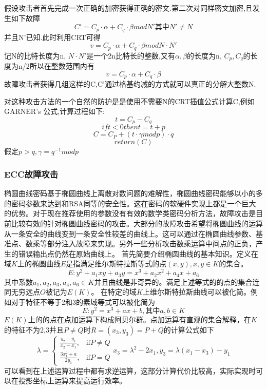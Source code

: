 \documentclass[a4paper,12pt]{article}
\begin{document}
\begin{CJK}{UTF8}{gkai}
假设攻击者首先完成一次正确的加密获得正确的密文.第二次对同样密文加密,且发生如下故障
$$C'=C_{p}\cdot\alpha+C_{q}\cdot\beta mod N'  其中 N'≠N$$
并且N’已知.此时利用CRT可得
$$v=C_{p}\cdot\alpha+C_{q}\cdot\beta mod N\cdot N'$$ 
记N的比特长度为n, $N\cdot N'$是一个2n比特长的整数,又有$\alpha,\beta$的长度为n, $C_{p},C_{q}$的长度为n/2所以在整数范围内有
$$v=C_{p}\cdot\alpha+C_{q}\cdot\beta$$
故障攻击者获得几组这样的C,C'通过格基约减的方式就可以真正的分解大整数N.

对这种攻击方法的一个自然的防护是是使用不需要N的CRT插值公式计算C,例如GARNER’s 公式,计算过程如下:
$$t=C_{p}-C_{q} $$
$$if t<0 then t=t+p $$
$$C=C_{P}+(t\cdot\gamma mod p)\cdot q $$
$$return (C)$$
假定$p>q,\gamma=q^{-1} mod p$

\subsubsection{ECC故障攻击}
椭圆曲线密码基于椭圆曲线上离散对数问题的难解性，椭圆曲线密码能够以小的多的密码参数来达到和RSA同等的安全性。这在密码的软硬件实现上都是一个巨大的优势。对于现在推荐使用的参数没有有效的数学类密码分析方法，故障攻击是目前比较有效的针对椭圆曲线密码的攻击。大部分的故障攻击希望将椭圆曲线的运算从一条安全的曲线变到一条安全性较差的曲线上。这可以通过在椭圆曲线参数、基准点、数乘等部分注入故障来实现。另外一些分析攻击数乘运算中间点的正负，产生的错误输出点仍然在原始曲线上。
首先简要介绍椭圆曲线的基本知识。定义在域$K$上的椭圆曲线$E$是指满足维尔斯特拉斯等式的点$(x, y), x,y\in K$的集合。
\begin{equation}
E:y^{2}+a_{1}xy+a_{3}y=x^{3}+a_{2}x^{2}+a_{4}x+a_{6}
\end{equation}
其中系数$a_{1},a_{2},a_{3},a_{4},a_{6}\in K$并且曲线是非奇异的。满足上述等式的的点的集合连同无穷远点$O$被记为$E(K)$。
在特定的域$K$上维尔斯特拉斯曲线可以被化简。例如对于特征不等于2和3的素域等式可以被化简为
\begin{equation}
E:y^{2} = x^{3} + ax + b, 其中a,b\in K
\end{equation}
$E(K)$上的的点在点加运算下构成阿贝尔群。点加运算有直观的集合解释，在$K$的特征不为2,3并且$P\neq Q$时$R = (x_{3}, y_{3}) = P+Q$的计算公式如下
\begin{equation}
\lambda = \begin{cases}
\frac{y_{2}-y_{1}}{x_{2}-x_{1}}, & \text{if} P\neq Q\\
\frac{3x_{1}^{2}+a}{2y_{1}}, & \text{if} P=Q
\end{cases}
x_{3} = \lambda^{2}-2x_{1}, y_{3}=\lambda(x_{1}-x_{3})-y_{1}
\end{equation}
可以看到在上述运算过程中都有求逆运算，这部分计算代价比较高，实际实现时可以在投影坐标上运算来提高运行效率。


\end{CJK}
\end{document}
